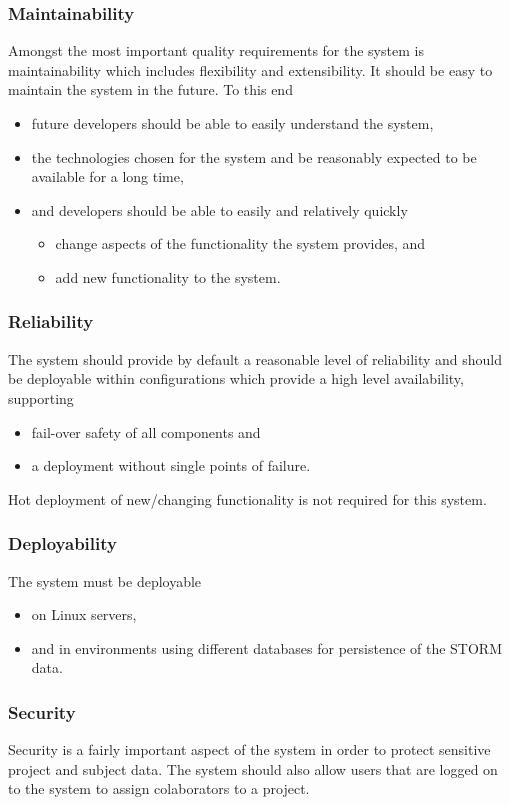 \subsubsection{Maintainability} 
Amongst the most important quality requirements for the system is maintainability which includes flexibility and extensibility. It should be easy to maintain the system in the future. To this end
\begin{itemize}
\item future developers should be able to easily understand the system,
\item the technologies chosen for the system and be reasonably expected to be available for a long time,
\item and developers should be able to easily and relatively quickly
\begin{itemize}
\item change aspects of the functionality the system provides, and
\item add new functionality to the system.
\end{itemize}
\end{itemize}

\subsubsection{Reliability}
The system should provide by default a reasonable level of reliability and should be deployable within configurations which provide a high level availability, supporting
\begin{itemize}
\item fail-over safety of all components and
\item a deployment without single points of failure.
\end{itemize}
Hot deployment of new/changing functionality is not required for this system.

\subsubsection{Deployability}
The system must be deployable
\begin{itemize}
\item on Linux servers,
\item and in environments using different databases for persistence of the STORM data.
\end{itemize}

\subsubsection{Security}
Security is a fairly important aspect of the system in order to protect sensitive project and subject data.
The system should also allow users that are logged on to the system to assign colaborators
to a project. 


